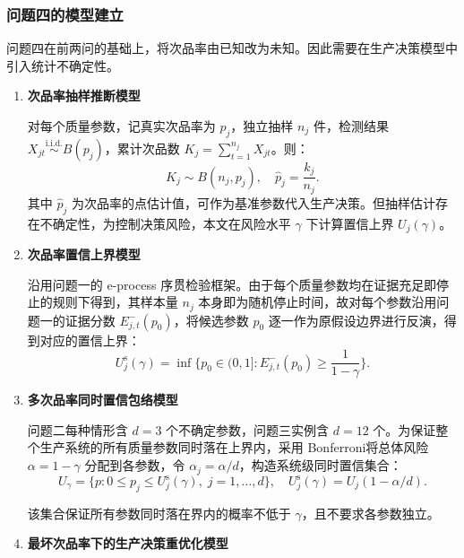 \documentclass[withoutpreface,bwprint]{cumcmthesis}
\numberwithin{equation}{section}
\begin{document}
\subsubsection{问题四的模型建立}

问题四在前两问的基础上，将次品率由已知改为未知。因此需要在生产决策模型中引入统计不确定性。

\begin{enumerate}[itemindent=2em]
\item \textbf{次品率抽样推断模型} 

\hspace{2em}对每个质量参数，记真实次品率为 $p_j$，独立抽样 $n_j$ 件，检测结果 $X_{jt} \stackrel{\text{i.i.d.}}{\sim} B(p_j)$，累计次品数 $K_j = \sum_{t=1}^{n_j} X_{jt}$。则：
\begin{equation}
K_j \sim B(n_j, p_j), \quad \hat{p}_j = \frac{k_j}{n_j}.
\end{equation}
其中 $\hat{p}_j$ 为次品率的点估计值，可作为基准参数代入生产决策。但抽样估计存在不确定性，为控制决策风险，本文在风险水平 $\gamma$ 下计算置信上界 $U_j(\gamma)$。
\item \textbf{次品率置信上界模型}

\hspace{2em}沿用问题一的 e-process 序贯检验框架。由于每个质量参数均在证据充足即停止的规则下得到，其样本量 $n_j$ 本身即为随机停止时间，故对每个参数沿用问题一的证据分数 $E_{j,t}^-(p_0)$，将候选参数 $p_0$ 逐一作为原假设边界进行反演，得到对应的置信上界：
\begin{equation}
U_j^{\text{s}}(\gamma) = \inf\{ p_0 \in (0,1] : E_{j,t}^-(p_0) \ge\frac{1}{1-\gamma}  \}.
\end{equation}


\item \textbf{多次品率同时置信包络模型}

\hspace{2em}问题二每种情形含 $d=3$ 个不确定参数，问题三实例含 $d=12$ 个。为保证整个生产系统的所有质量参数同时落在上界内，采用 Bonferroni将总体风险 $\alpha = 1-\gamma$ 分配到各参数，令 $\alpha_j = \alpha/d$，构造系统级同时置信集合：
\begin{equation}
U_\gamma = \{ p : 0 \le p_j \le U_j^{\text{s}}(\gamma),\; j=1,\dots,d \}, \quad U_j^{\text{s}}(\gamma) = U_j(1-\alpha/d).
\end{equation}

该集合保证所有参数同时落在界内的概率不低于 $\gamma$，且不要求各参数独立。


\item \textbf{最坏次品率下的生产决策重优化模型}


\end{enumerate}
\end{document}
